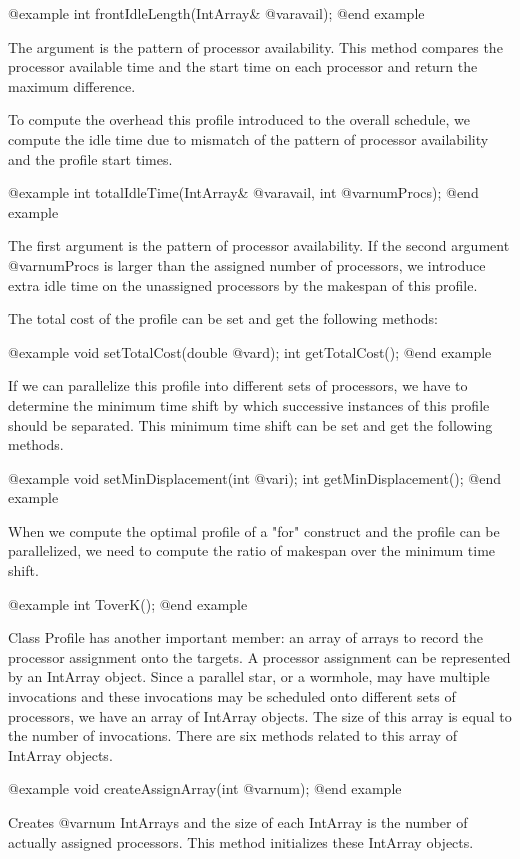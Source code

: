 {@example
int frontIdleLength(IntArray& @var{avail});
@end example

The argument is the pattern of processor availability. This method
compares the processor available time and the start time on each
processor and return the maximum difference.

To compute the overhead this profile introduced to the overall schedule,
we compute the idle time due to mismatch of the pattern of
processor availability and the profile start times.

@example
int totalIdleTime(IntArray& @var{avail}, int @var{numProcs});
@end example

The first argument is the pattern of processor availability. If the
second argument @var{numProcs} is larger than the assigned number
of processors, we introduce extra idle time on the unassigned processors
by the makespan of this profile.

The total cost of the profile can be set and get the following methods:

@example
void setTotalCost(double @var{d});
int getTotalCost();
@end example

If we can parallelize this profile into different sets of processors,
we have to determine the minimum time shift by which successive instances of
this profile should be separated. This minimum time shift can be
set and get the following methods.

@example
void setMinDisplacement(int @var{i});
int getMinDisplacement();
@end example

When we compute the optimal profile of a "for" construct and 
the profile can be parallelized, we need to 
compute the ratio of makespan over the minimum time shift.

@example
int ToverK();
@end example

Class Profile has another important member: an array of arrays to
record the processor assignment onto the targets. A processor
assignment can be represented by an IntArray object. Since a
parallel star, or a wormhole, may have multiple invocations and
these invocations may be scheduled onto different sets of processors,
we have an array of IntArray objects. The size of this array is equal to
the number of invocations. There are six methods related to this array of
IntArray objects.

@example
void createAssignArray(int @var{num});
@end example

Creates @var{num} IntArrays and the size of each IntArray is the
number of actually assigned processors. This method initializes these
IntArray objects.

}
